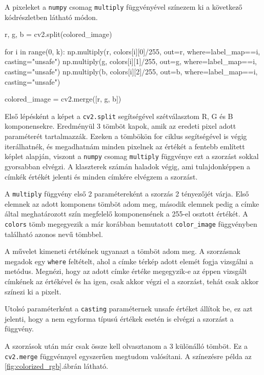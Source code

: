 A pixeleket a \texttt{numpy} csomag \texttt{multiply} függvényével színezem ki a következő kódrészletben látható módon.

\begin{python}
r, g, b = cv2.split(colored_image)

for i in range(0, k):
    np.multiply(r, colors[i][0]/255, out=r,
                where=label_map==i, casting="unsafe")
    np.multiply(g, colors[i][1]/255, out=g,
                where=label_map==i, casting="unsafe")
    np.multiply(b, colors[i][2]/255, out=b,
                where=label_map==i, casting="unsafe")

colored_image = cv2.merge([r, g, b])
\end{python}

Első lépésként a képet a \texttt{cv2.split} segítségével szétválasztom R, G és B komponensekre. Eredményül 3 tömböt kapok, amik az eredeti pixel adott paraméterét tartalmazzák. Ezeken a tömbökön for ciklus segítségével is végig iterálhatnék, és megadhatnám minden pixelnek az értékét a fentebb említett képlet alapján, viszont a \texttt{numpy} csomag \texttt{multiply} függvénye ezt a szorzást sokkal gyorsabban elvégzi. A klaszterek számán haladok végig, ami tulajdonképpen a címkék értékét jelenti és minden címkére elvégzem a szorzást.

A \texttt{multiply} függvény első 2 paramétereként a szorzás 2 tényezőjét várja. Első elemnek az adott komponens tömböt adom meg, második elemnek pedig a címke által meghatározott szín megfelelő komponensének a 255-el osztott értékét. A \texttt{colors} tömb megegyezik a már korábban bemutatott \texttt{color\_image} függvényben található azonos nevű tömbbel.

A művelet kimeneti értékének ugyanazt a tömböt adom meg. A szorzásnak megadok egy \texttt{where} feltételt, ahol a címke térkép adott elemét fogja vizsgálni a metódus. Megnézi, hogy az adott címke értéke megegyzik-e az éppen vizsgált címkének az értékével és ha igen, csak akkor végzi el a szorzást, tehát csak akkor színezi ki a pixelt.

Utolsó paraméterként a \texttt{casting} paraméternek unsafe értéket állítok be, ez azt jelenti, hogy a nem egyforma típusú értékek esetén is elvégzi a szorzást a függvény.

A szorzások után már csak össze kell olvasztanom a 3 különálló tömböt. Ez a \texttt{cv2.merge} függvénnyel egyszerűen megtudom valósítani. A színezésre példa az \ref{fig:colorized_rgb}.ábrán látható.

